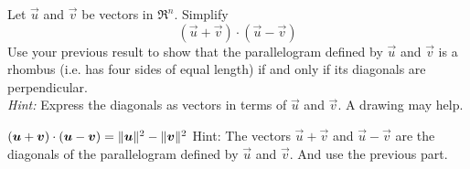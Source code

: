 
\begin{Exercise}[
name={},
title={}, 
difficulty=0,
origin={\cite{MH}}]
Let $\vec u$ and $\vec v$ be vectors in $\Re^n$.
\Question Simplify
$$\left(\vec u+\vec v\right)\cdot\left(\vec u-\vec v\right)$$
\Question Use your previous result to show that the parallelogram defined by $\vec u$ and $\vec v$ is a rhombus (i.e. has four sides of equal length) if and only if its diagonals are perpendicular.\\
\textit{Hint:} Express the diagonals as vectors in terms of $\vec u$ and $\vec v$. A drawing may help.
\end{Exercise}

\begin{Answer}
\Question $\left(\bm{u}+\bm{v}\right)\cdot\left(\bm{u}-\bm{v}\right)=\lVert\bm{u}\rVert^2-\lVert\bm{v}\rVert^2$
\Question Hint: The vectors $\vec u+\vec v$ and $\vec u-\vec v$ are the diagonals of the parallelogram defined by $\vec u$ and $\vec v$. And use the previous part.
\end{Answer}
